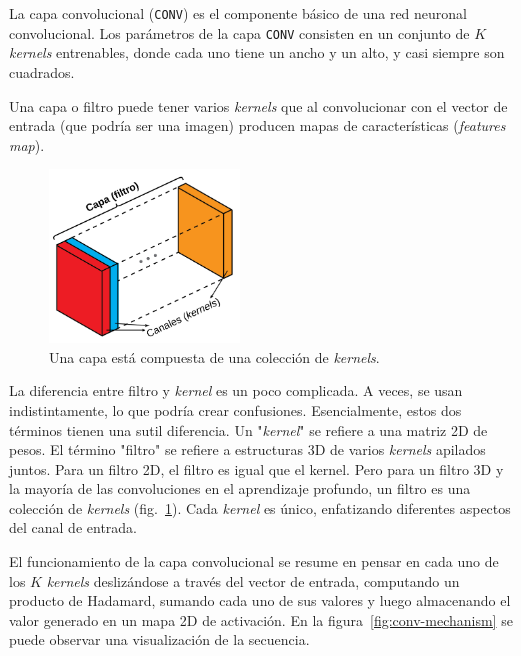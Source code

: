 \documentclass[a4paper,12pt]{article}
\begin{document}
La capa convolucional (\texttt{CONV}) es el componente básico de una red neuronal convolucional. Los parámetros de la capa \texttt{CONV} consisten en un conjunto de $K$ \textit{kernels} entrenables, donde cada uno tiene un ancho y un alto, y casi siempre son cuadrados. 

Una capa o filtro puede tener varios \textit{kernels} que al convolucionar con el vector de entrada (que podría ser una imagen) producen mapas de características (\textit{features map}).

\begin{figure}[H]
	\begin{center}				
	\includegraphics[width=0.45\textwidth]{layer-kernels.png}
  	\caption{Una capa está compuesta de una colección de \textit{kernels}.}
  	\label{fig:layer-kernel}
  	\end{center}
\end{figure}

La diferencia entre filtro y \textit{kernel} es un poco complicada. A veces, se usan indistintamente, lo que podría crear confusiones. Esencialmente, estos dos términos tienen una sutil diferencia. Un "\textit{kernel}" se refiere a una matriz 2D de pesos. El término "filtro" se refiere a estructuras 3D de varios \textit{kernels} apilados juntos. Para un filtro 2D, el filtro es igual que el kernel. Pero para un filtro 3D y la mayoría de las convoluciones en el aprendizaje profundo, un filtro es una colección de \textit{kernels} (fig.~\ref{fig:layer-kernel}). Cada \textit{kernel} es único, enfatizando diferentes aspectos del canal de entrada.

El funcionamiento de la capa convolucional se resume en pensar en cada uno de los $K$ \textit{kernels} deslizándose a través del vector de entrada, computando un producto de Hadamard, sumando cada uno de sus valores y luego almacenando el valor generado en un mapa 2D de activación. En la figura~\ref{fig:conv-mechanism} se puede observar una visualización de la secuencia.
\end{document}
